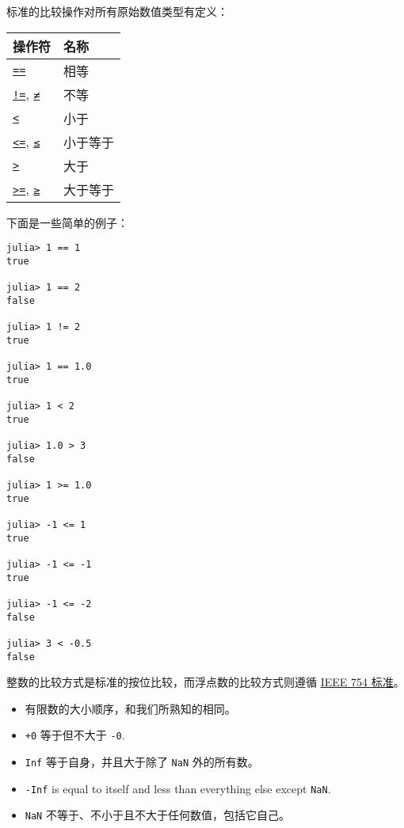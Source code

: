 标准的比较操作对所有原始数值类型有定义：




\begin{table}[h]

\begin{tabulary}{\linewidth}{|L|L|}
\hline
操作符 & 名称 \\
\hline
\hyperlink{15143149452920304570}{\texttt{==}} & 相等 \\
\hline
\hyperlink{3046079188653285114}{\texttt{!=}}, \hyperlink{3046079188653285114}{\texttt{≠}} & 不等 \\
\hline
\hyperlink{702782232449268329}{\texttt{<}} & 小于 \\
\hline
\hyperlink{11411050964021316526}{\texttt{<=}}, \hyperlink{11411050964021316526}{\texttt{≤}} & 小于等于 \\
\hline
\hyperlink{8677991761303191103}{\texttt{>}} & 大于 \\
\hline
\hyperlink{7019639580556993898}{\texttt{>=}}, \hyperlink{7019639580556993898}{\texttt{≥}} & 大于等于 \\
\hline
\end{tabulary}

\end{table}



下面是一些简单的例子：




\begin{verbatim}
julia> 1 == 1
true

julia> 1 == 2
false

julia> 1 != 2
true

julia> 1 == 1.0
true

julia> 1 < 2
true

julia> 1.0 > 3
false

julia> 1 >= 1.0
true

julia> -1 <= 1
true

julia> -1 <= -1
true

julia> -1 <= -2
false

julia> 3 < -0.5
false
\end{verbatim}



整数的比较方式是标准的按位比较，而浮点数的比较方式则遵循 \href{https://en.wikipedia.org/wiki/IEEE\_754-2008}{IEEE 754 标准}。



\begin{itemize}
\item 有限数的大小顺序，和我们所熟知的相同。


\item \texttt{+0} 等于但不大于 \texttt{-0}.


\item \texttt{Inf} 等于自身，并且大于除了 \texttt{NaN} 外的所有数。


\item \texttt{-Inf} is equal to itself and less than everything else except \texttt{NaN}.


\item \texttt{NaN} 不等于、不小于且不大于任何数值，包括它自己。

\end{itemize}



